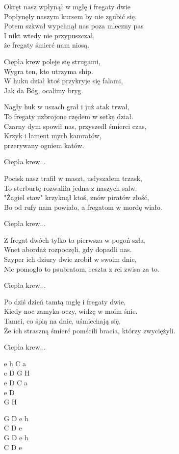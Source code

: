 \begin{text}   
    Okręt nasz wpłynął w mgłę i fregaty dwie\\
    Popłynęły naszym kursem by nie zgubić się.\\
    Potem szkwał wypchnął nas poza mleczny pas\\
    I nikt wtedy nie przypuszczał,\\
    że fregaty śmierć nam niosą.

    \vin Ciepła krew poleje się strugami,\\
    \vin Wygra ten, kto utrzyma ship.\\
    \vin W huku dział ktoś przykryje się falami,\\
    \vin Jak da Bóg, ocalimy bryg.

    Nagły huk w uszach grał i już atak trwał,\\
    To fregaty uzbrojone rzędem w setkę dział.\\
    Czarny dym spowił nas, przyszedł śmierci czas,\\
    Krzyk i lament mych kamratów,\\
    przerywany ogniem katów.

    \vin Ciepła krew...

    Pocisk nasz trafił w maszt, usłyszałem trzask,\\
    To sterburtę rozwaliła jedna z naszych salw.\\
    "Żagiel staw" krzyknął ktoś, znów piratów złość,\\
    Bo od rufy nam powiało, a fregatom w mordę wiało.

    \vin Ciepła krew...

    Z fregat dwóch tylko ta pierwsza w pogoń szła,\\
    Wnet abordaż rozpoczęli, gdy dopadli nas.\\
    Szyper ich dziury dwie zrobił w swoim dnie,\\
    Nie pomogło to psubratom, reszta z rei zwisa za to.

    \vin Ciepła krew...

    Po dziś dzień tamtą mgłę i fregaty dwie,\\
    Kiedy noc zamyka oczy, widzę w moim śnie.\\
    Tamci, co śpią na dnie, uśmiechają się,\\
    Że ich straszną śmierć pomścili bracia, którzy zwyciężyli.

    \vin Ciepła krew...   
\end{text}
\begin{chord}
    e h C a\\
    e D G H\\
    e D C a\\
    e D\\
    G H

    G D e h\\
    C D e\\
    G D e h\\
    C D e
\end{chord}